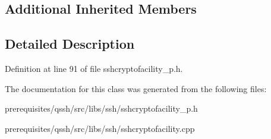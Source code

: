 \subsection*{Additional Inherited Members}


\subsection{Detailed Description}


Definition at line 91 of file sshcryptofacility\+\_\+p.\+h.



The documentation for this class was generated from the following files\+:\begin{DoxyCompactItemize}
\item 
prerequisites/qssh/src/libs/ssh/sshcryptofacility\+\_\+p.\+h\item 
prerequisites/qssh/src/libs/ssh/sshcryptofacility.\+cpp\end{DoxyCompactItemize}
